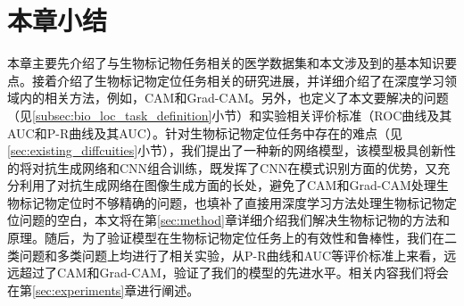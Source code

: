 \section{本章小结}
本章主要先介绍了与生物标记物任务相关的医学数据集和本文涉及到的基本知识要点。接着介绍了生物标记物定位任务相关的研究进展，并详细介绍了在深度学习领域内的相关方法，例如，CAM和Grad-CAM。另外，也定义了本文要解决的问题（见\ref{subsec:bio_loc_task_definition}小节）和实验相关评价标准（ROC曲线及其AUC和P-R曲线及其AUC）。针对生物标记物定位任务中存在的难点（见\ref{sec:existing_diffcuities}小节），我们提出了一种新的网络模型，该模型极具创新性的将对抗生成网络和CNN组合训练，既发挥了CNN在模式识别方面的优势，又充分利用了对抗生成网络在图像生成方面的长处，避免了CAM和Grad-CAM处理生物标记物定位时不够精确的问题，也填补了直接用深度学习方法处理生物标记物定位问题的空白，本文将在第\ref{sec:method}章详细介绍我们解决生物标记物的方法和原理。随后，为了验证模型在生物标记物定位任务上的有效性和鲁棒性，我们在二类问题和多类问题上均进行了相关实验，从P-R曲线和AUC等评价标准上来看，远远超过了CAM和Grad-CAM，验证了我们的模型的先进水平。相关内容我们将会在第\ref{sec:experiments}章进行阐述。